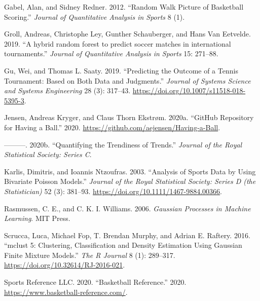 \documentclass[
  11pt,
]{svjour3}
\theoremstyle{nonumberplain}
\begin{document}
\leavevmode\hypertarget{ref-gabel2012random}{}%
Gabel, Alan, and Sidney Redner. 2012. ``Random Walk Picture of
Basketball Scoring.'' \emph{Journal of Quantitative Analysis in Sports}
8 (1).

\leavevmode\hypertarget{ref-groll2019}{}%
Groll, Andreas, Christophe Ley, Gunther Schauberger, and Hans Van
Eetvelde. 2019. ``A hybrid random forest to predict soccer matches in
international tournaments.'' \emph{Journal of Quantitative Analysis in
Sports} 15: 271--88.

\leavevmode\hypertarget{ref-Gu2019}{}%
Gu, Wei, and Thomas L. Saaty. 2019. ``Predicting the Outcome of a Tennis
Tournament: Based on Both Data and Judgments.'' \emph{Journal of Systems
Science and Systems Engineering} 28 (3): 317--43.
\url{https://doi.org/10.1007/s11518-018-5395-3}.

\leavevmode\hypertarget{ref-HavingABallGitHub}{}%
Jensen, Andreas Kryger, and Claus Thorn Ekstrøm. 2020a. ``GitHub
Repository for Having a Ball.'' 2020.
\url{https://github.com/aejensen/Having-a-Ball}.

\leavevmode\hypertarget{ref-ToT}{}%
---------. 2020b. ``Quantifying the Trendiness of Trends.''
\emph{Journal of the Royal Statistical Society: Series C}.

\leavevmode\hypertarget{ref-skellam2}{}%
Karlis, Dimitris, and Ioannis Ntzoufras. 2003. ``Analysis of Sports Data
by Using Bivariate Poisson Models.'' \emph{Journal of the Royal
Statistical Society: Series D (the Statistician)} 52 (3): 381--93.
\url{https://doi.org/10.1111/1467-9884.00366}.

\leavevmode\hypertarget{ref-rasmussen2003gaussian}{}%
Rasmussen, C. E., and C. K. I. Williams. 2006. \emph{Gaussian Processes
in Machine Learning}. MIT Press.

\leavevmode\hypertarget{ref-mclust}{}%
Scrucca, Luca, Michael Fop, T. Brendan Murphy, and Adrian E. Raftery.
2016. ``mclust 5: Clustering, Classification and Density Estimation
Using Gaussian Finite Mixture Models.'' \emph{The R Journal} 8 (1):
289--317. \url{https://doi.org/10.32614/RJ-2016-021}.

\leavevmode\hypertarget{ref-BBreference}{}%
Sports Reference LLC. 2020. ``Basketball Reference.'' 2020.
\url{https://www.basketball-reference.com/}.
\end{document}
